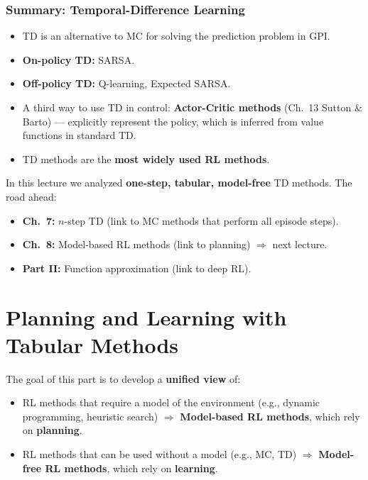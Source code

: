 \documentclass[11pt,a4paper]{article}
\theoremstyle{definition}
\theoremstyle{plain}
\theoremstyle{remark}
\begin{document}
\section{Summary: Temporal-Difference Learning}

\begin{itemize}
    \item TD is an alternative to MC for solving the prediction problem in GPI.
    \item \textbf{On-policy TD:} SARSA.
    \item \textbf{Off-policy TD:} Q-learning, Expected SARSA.
    \item A third way to use TD in control: \textbf{Actor-Critic methods} (Ch.\ 13 Sutton \& Barto) — explicitly represent the policy, which is inferred from value functions in standard TD.
    \item TD methods are the \textbf{most widely used RL methods}.
\end{itemize}

In this lecture we analyzed \textbf{one-step, tabular, model-free} TD methods. The road ahead:
\begin{itemize}
    \item \textbf{Ch.\ 7:} $n$-step TD (link to MC methods that perform all episode steps).
    \item \textbf{Ch.\ 8:} Model-based RL methods (link to planning) $\Rightarrow$ next lecture.
    \item \textbf{Part II:} Function approximation (link to deep RL).
\end{itemize}


\part{Planning and Learning with Tabular Methods}

The goal of this part is to develop a \textbf{unified view} of:
\begin{itemize}
    \item RL methods that require a model of the environment (e.g., dynamic programming, heuristic search) $\Rightarrow$ \textbf{Model-based RL methods}, which rely on \textbf{planning}.
    \item RL methods that can be used without a model (e.g., MC, TD) $\Rightarrow$ \textbf{Model-free RL methods}, which rely on \textbf{learning}.
\end{itemize}
\end{document}

